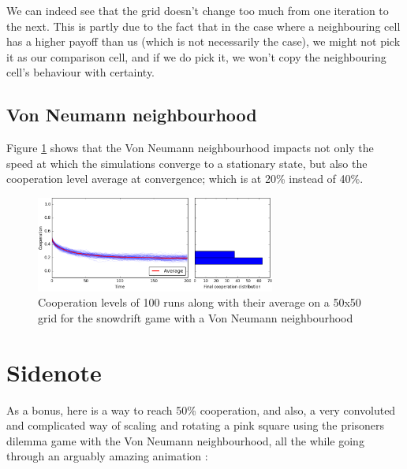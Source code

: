 \documentclass[a4paper]{article}
\begin{document}
We can indeed see that the grid doesn't change too much from one iteration to
the next. This is partly due to the fact that in the case where a neighbouring
cell has a higher payoff than us (which is not necessarily the case), we might
not pick it as our comparison cell, and if we do pick it, we won't copy the
neighbouring cell's behaviour with certainty.

\subsection{Von Neumann neighbourhood}
Figure \ref{sd_vn50} shows that the Von Neumann neighbourhood impacts not
only the speed at which the simulations converge to a stationary state, but
also the cooperation level average at convergence; which is at 20\% instead
of 40\%. 
\begin{figure}[H]
	\centering
	\includegraphics[width=0.7\textwidth]{./fig/sd_vn_50.png}
	\caption{Cooperation levels of 100 runs along with their average
	on a 50x50 grid for the snowdrift game with a Von Neumann neighbourhood}
	\label{sd_vn50}
\end{figure}

\section{Sidenote}
As a bonus, here is a way to reach 50\% cooperation, and also, a very 
convoluted and complicated way of scaling and rotating a pink square using
the prisoners dilemma game with the Von Neumann neighbourhood, all the while
going through an arguably amazing animation : 
\end{document}
